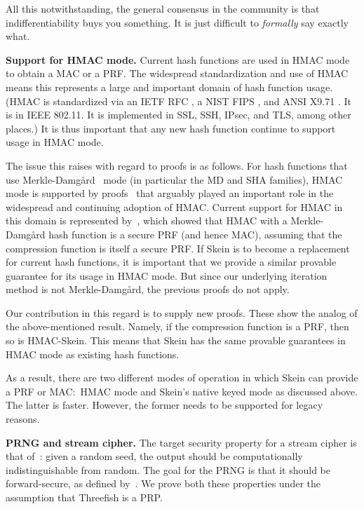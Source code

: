\documentclass[11pt,twoside]{article}
\begin{document}
All this notwithstanding, the general consensus in the community is that indifferentiability buys you something.  It is just difficult to \textit{formally} say exactly what.

{\bf Support for HMAC mode.}  Current hash functions are used in HMAC mode to obtain a MAC or a PRF. The widespread standardization and use of HMAC means this represents a large and important domain of hash function usage.  (HMAC is standardized via an IETF RFC \cite{hmac-rfc}, a NIST FIPS \cite{HMAC2}, and ANSI X9.71 \cite{ansi-hmac}.  It is in IEEE 802.11. It is implemented in SSL, SSH, IPsec, and TLS, among other places.) It is thus important that any new hash function continue to support usage in HMAC mode.

The issue this raises with regard to proofs is as follows.  For hash functions that use Merkle-Damg{\aa}rd~\cite{MD,Mer89a} mode (in particular the MD and SHA families), HMAC mode is supported by proofs~\cite{HMAC1,B06} that arguably played an important role in the widespread and continuing adoption of HMAC. Current support for HMAC in this domain is represented by~\cite{B06}, which showed that HMAC with a  Merkle-Damg{\aa}rd hash function is a secure PRF (and hence MAC), assuming that the compression function is itself a secure PRF. If Skein is to become a replacement for current hash functions, it is important that we provide a similar provable guarantee for its usage in HMAC mode.  But since our underlying iteration method is not Merkle-Damg{\aa}rd, the previous proofs do not apply.

Our contribution in this regard is to supply new proofs. These show the analog of the above-mentioned result.  Namely, if the compression function is a PRF, then so is HMAC-Skein. This means that Skein has the same provable guarantees in HMAC mode as existing hash functions.

As a result, there are two different modes of operation in which Skein can provide a PRF or MAC:~HMAC mode and Skein's native keyed mode as discussed above.  The latter is faster.  However, the former needs to be supported for legacy reasons.

{\bf PRNG and stream cipher.}  The target security property for a stream cipher is that of~\cite{Blum-Micali, Yao}: given a random seed, the output should be computationally indistinguishable from random. The goal for the PRNG is that it should be forward-secure, as defined by~\cite{Bellare-Yee}.  We prove both these properties under the assumption that Threefish is a PRP.
\end{document}
